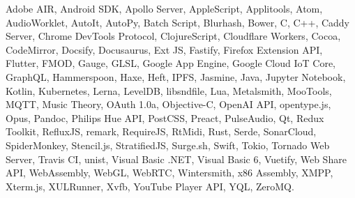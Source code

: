 \documentclass[a4paper]{article}
\begin{document}
Adobe AIR, Android SDK, Apollo Server, AppleScript, Applitools, Atom, AudioWorklet, AutoIt, AutoPy, Batch Script, Blurhash, Bower, C, C++, Caddy Server, Chrome DevTools Protocol, ClojureScript, Cloudflare Workers, Cocoa, CodeMirror, Docsify, Docusaurus, Ext JS, Fastify, Firefox Extension API, Flutter, FMOD, Gauge, GLSL, Google App Engine, Google Cloud IoT Core, GraphQL, Hammerspoon, Haxe, Heft, IPFS, Jasmine, Java, Jupyter Notebook, Kotlin, Kubernetes, Lerna, LevelDB, libsndfile, Lua, Metalsmith, MooTools, MQTT, Music Theory, OAuth 1.0a, Objective-C, OpenAI API, opentype.js, Opus, Pandoc, Philips Hue API, PostCSS, Preact, PulseAudio, Qt, Redux Toolkit, RefluxJS, remark, RequireJS, RtMidi, Rust, Serde, SonarCloud, SpiderMonkey, Stencil.js, StratifiedJS, Surge.sh, Swift, Tokio, Tornado Web Server, Travis CI, unist, Visual Basic .NET, Visual Basic 6, Vuetify, Web Share API, WebAssembly, WebGL, WebRTC, Wintersmith, x86 Assembly, XMPP, Xterm.js, XULRunner, Xvfb, YouTube Player API, YQL, ZeroMQ.

\vspace{2mm}





\ 
\end{document}
